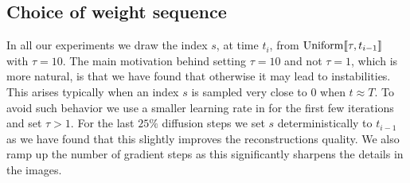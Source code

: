 \subsection{Choice of weight sequence}
\label{apdx-sec:weight-seq}
In all our experiments we draw the index $s$, at time $t_i$, from $\mbox{Uniform}\llbracket \tau, t_{i-1} \rrbracket$ with $\tau = 10$. The main motivation behind setting $\tau = 10$ and not $\tau = 1$, which is more natural, is that we have found that otherwise it may lead to instabilities. This arises typically when an index $s$ is sampled very close to $0$ when $t \approx T$. To avoid such behavior we use a smaller learning rate in  for the first few iterations and set $\tau > 1$. For the last $25\%$ diffusion steps we set $s$ deterministically to $t_{i-1}$ as we have found that this slightly improves the reconstructions quality. We also ramp up the number of gradient steps as this significantly sharpens the details in the images. 

